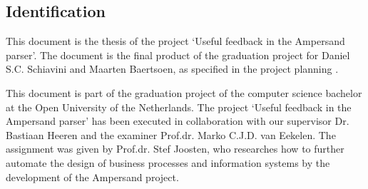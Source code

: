 
\subsection{Identification}
This document is the thesis of the project `Useful feedback in the Ampersand parser'.
The document is the final product of the graduation project for Daniel S.C. Schiavini and Maarten Baertsoen, as specified in the project planning .

This document is part of the graduation project of the computer science bachelor at the Open University of the Netherlands.
The project `Useful feedback in the Ampersand parser' has been executed in collaboration with our supervisor Dr. Bastiaan Heeren and the examiner Prof.dr. Marko C.J.D. van Eekelen.
The assignment was given by Prof.dr. Stef Joosten, who researches how to further automate the design of business processes and information systems by the development of the Ampersand project.
